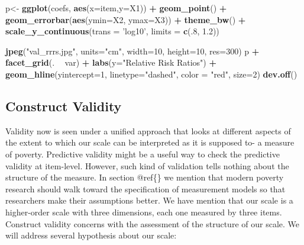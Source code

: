 \documentclass[]{book}
\newenvironment{Shaded}{\begin{snugshade}}{\end{snugshade}}
\newcommand{\DataTypeTok}[1]{\textcolor[rgb]{0.13,0.29,0.53}{#1}}
\newcommand{\DecValTok}[1]{\textcolor[rgb]{0.00,0.00,0.81}{#1}}
\newcommand{\FloatTok}[1]{\textcolor[rgb]{0.00,0.00,0.81}{#1}}
\newcommand{\KeywordTok}[1]{\textcolor[rgb]{0.13,0.29,0.53}{\textbf{#1}}}
\newcommand{\NormalTok}[1]{#1}
\newcommand{\OperatorTok}[1]{\textcolor[rgb]{0.81,0.36,0.00}{\textbf{#1}}}
\newcommand{\StringTok}[1]{\textcolor[rgb]{0.31,0.60,0.02}{#1}}
\begin{document}
\begin{Shaded}
\begin{Highlighting}[]
\NormalTok{p<-}\StringTok{ }\KeywordTok{ggplot}\NormalTok{(coefs, }\KeywordTok{aes}\NormalTok{(}\DataTypeTok{x=}\NormalTok{item,}\DataTypeTok{y=}\NormalTok{X1)) }\OperatorTok{+}\StringTok{ }\KeywordTok{geom_point}\NormalTok{() }\OperatorTok{+}\StringTok{  }
\StringTok{  }\KeywordTok{geom_errorbar}\NormalTok{(}\KeywordTok{aes}\NormalTok{(}\DataTypeTok{ymin=}\NormalTok{X2, }\DataTypeTok{ymax=}\NormalTok{X3)) }\OperatorTok{+}
\StringTok{ }\KeywordTok{theme_bw}\NormalTok{() }\OperatorTok{+}\StringTok{ }\KeywordTok{scale_y_continuous}\NormalTok{(}\DataTypeTok{trans =} \StringTok{'log10'}\NormalTok{, }\DataTypeTok{limits =} \KeywordTok{c}\NormalTok{(.}\DecValTok{8}\NormalTok{, }\FloatTok{1.2}\NormalTok{))}

\KeywordTok{jpeg}\NormalTok{(}\StringTok{"val_rrrs.jpg"}\NormalTok{, }\DataTypeTok{units=}\StringTok{"cm"}\NormalTok{, }\DataTypeTok{width=}\DecValTok{10}\NormalTok{, }\DataTypeTok{height=}\DecValTok{10}\NormalTok{, }\DataTypeTok{res=}\DecValTok{300}\NormalTok{)}
\NormalTok{p }\OperatorTok{+}\StringTok{ }\KeywordTok{facet_grid}\NormalTok{(. }\OperatorTok{~}\StringTok{ }\NormalTok{var) }\OperatorTok{+}\StringTok{ }\KeywordTok{labs}\NormalTok{(}\DataTypeTok{y=}\StringTok{"Relative Risk Ratios"}\NormalTok{) }\OperatorTok{+}\StringTok{ }\KeywordTok{geom_hline}\NormalTok{(}\DataTypeTok{yintercept=}\DecValTok{1}\NormalTok{, }\DataTypeTok{linetype=}\StringTok{"dashed"}\NormalTok{,}
                \DataTypeTok{color =} \StringTok{"red"}\NormalTok{, }\DataTypeTok{size=}\DecValTok{2}\NormalTok{)}
\KeywordTok{dev.off}\NormalTok{()}
\end{Highlighting}
\end{Shaded}

\hypertarget{construct-validity-1}{%
\subsection{Construct Validity}\label{construct-validity-1}}

Validity now is seen under a unified approach that looks at different aspects of the extent to which our scale can be interpreted as it is supposed to- a measure of poverty. Predictive validity might be a useful way to check the predictive validity at item-level. However, such kind of validation tells nothing about the structure of the measure. In section @ref\{\} we mention that modern poverty research should walk toward the specification of measurement models so that researchers make their assumptions better. We have mention that our scale is a higher-order scale with three dimensions, each one measured by three items. Construct validity concerns with the assessment of the structure of our scale. We will address several hypothesis about our scale:
\end{document}
